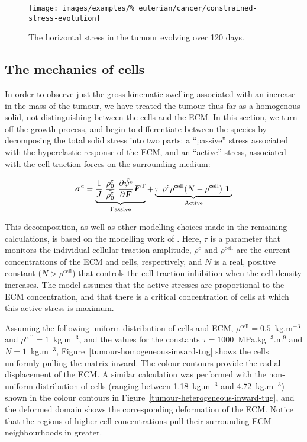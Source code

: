 \begin{figure}[!hptb]
\centering
\texttt{[image: images/examples/\%
eulerian/cancer/constrained-stress-evolution]}
\caption{The horizontal stress in the tumour evolving over 120 days.}
\label{tumour-constrained-stress-evolution}
\end{figure}

\clearpage

\subsection{The mechanics of cells}
\label{cell-roles}

In order to observe just the gross kinematic swelling associated with
an increase in the mass of the tumour, we have treated the tumour thus
far as a homogenous solid, not distinguishing between the cells and
the ECM. In this section, we turn off the growth process, and begin to
differentiate between the species by decomposing the total solid
stress into two parts: a ``passive'' stress associated with the
hyperelastic response of the ECM, and an ``active'' stress, associated
with the cell traction forces on the surrounding medium:

\begin{equation}
\mbox{\boldmath$\sigma$}^{\mathrm{c}} =
\underbrace{\frac{1}{J}\ \frac{\rho_{0}^{\mathrm{c}}}
  {\tilde{\rho_{0}^{\mathrm{c}}}}\    
\frac{\partial \hat{\psi^{\mathrm{c}}}}{\partial
  \mbox{\boldmath$ F$}}  \mbox{\boldmath$ F$}^{\mathrm{T}} }_{\text{Passive}}
+ \underbrace{\tau\ \rho^{\mathrm{c}} \rho^{\mathrm{cell}}
(N - \rho^{\mathrm{cell}})\ {\bf 1}.
}_{\text{Active}}
\label{activepassivesplit}
\end{equation}

\noindent This decomposition, as well as other modelling choices made
in the remaining calculations, is based on the modelling work of
\citet{namyetal:04}. Here, $\tau$ is a parameter that monitors the
individual cellular traction amplitude, $\rho^{\mathrm{c}}$ and
$\rho^{\mathrm{cell}}$ are the current concentrations of the ECM and
cells, respectively, and $N$ is a real, positive constant
($N>\rho^{\mathrm{cell}}$) that controls the cell traction inhibition
when the cell density increases. The model assumes that the active
stresses are proportional to the ECM concentration, and that there is
a critical concentration of cells at which this active stress is
maximum.

Assuming the following uniform distribution of cells and ECM,
$\rho^{\mathrm{cell}}=0.5$~kg.m$^{-3}$ and
$\rho^{\mathrm{cell}}=1$~kg.m$^{-3}$, and the values for the constants
$\tau=1000$~MPa.kg$^{-3}$.m$^{9}$ and $N=1$~kg.m$^{-3}$,
Figure~\ref{tumour-homogeneous-inward-tug} shows the cells uniformly
pulling the matrix inward. The colour contours provide the radial
displacement of the ECM. A similar calculation was performed with the
non-uniform distribution of cells (ranging between 1.18~kg.m$^{-3}$
and 4.72~kg.m$^{-3}$) shown in the colour contours in
Figure~\ref{tumour-heterogeneous-inward-tug}, and the deformed domain
shows the corresponding deformation of the ECM. Notice that the
regions of higher cell concentrations pull their surrounding ECM
neighbourhoods in greater.

